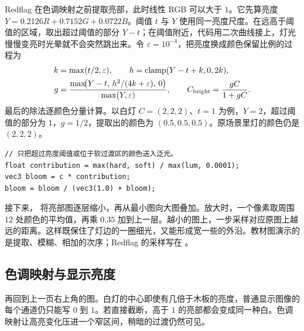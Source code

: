 Redflag 在色调映射之前提取亮部，此时线性 RGB 可以大于 $1$。它先算亮度 $Y=0.2126R+0.7152G+0.0722B$。阈值 $t$ 与 $Y$ 使用同一亮度尺度。在远高于阈值的区域，取出超过阈值的部分 $Y-t$；在阈值附近，代码用二次曲线接上，灯光慢慢变亮时光晕就不会突然跳出来。令 $\varepsilon=10^{-4}$，把亮度换成颜色保留比例的过程为
\[
\begin{aligned}
k&=\max(t/2,\varepsilon),\qquad h=\operatorname{clamp}(Y-t+k,0,2k),\\
g&=\frac{\max\!\bigl(Y-t,\,h^2/(4k+\varepsilon),\,0\bigr)}
             {\max(Y,\varepsilon)},\qquad C_{\rm bright}=\frac{gC}{1+gC}.
\end{aligned}
\]
最后的除法逐颜色分量计算。以白灯 $C=(2,2,2)$、$t=1$ 为例，$Y=2$，超过阈值的部分为 $1$，$g=1/2$，提取出的颜色为 $(0.5,0.5,0.5)$。原场景里灯的颜色仍是 $(2,2,2)$。
\begin{lstlisting}
// 只把超过亮度阈值或位于软过渡区的颜色送入泛光。
float contribution = max(hard, soft) / max(lum, 0.0001);
vec3 bloom = c * contribution;
bloom = bloom / (vec3(1.0) + bloom);
\end{lstlisting}
接下来， 将亮部图逐层缩小，再从最小图向大图叠加。放大时，一个像素取周围 12 处颜色的平均值，再乘 $0.35$ 加到上一层。越小的图上，一步采样对应原图上越远的距离。这样既保住了灯边的一圈细光，又能形成宽一些的外沿。教材图演示的是提取、模糊、相加的次序；Redflag 的采样写在 。

\clearpage
\subsection{色调映射与显示亮度}
再回到上一页右上角的图。白灯的中心即使有几倍于木板的亮度，普通显示图像的每个通道仍只能写 $0$ 到 $1$。若直接截断，高于 $1$ 的亮部都会变成同一种白。色调映射让高亮变化压进一个窄区间，稍暗的过渡仍然可见。

